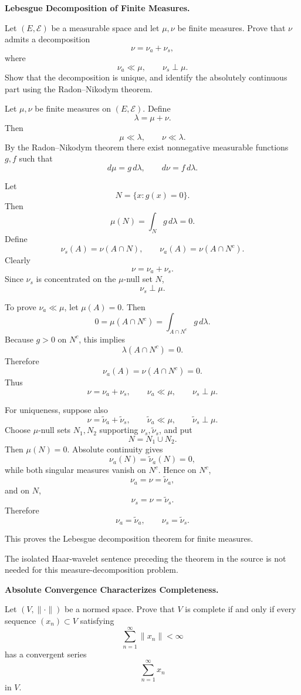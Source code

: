 \begin{problem}[CP-II-0498]
\label{prob:cp-ii-0498}
\textbf{Lebesgue Decomposition of Finite Measures.}

\hspace*{1.5em}Let \((E,\mathcal E)\) be a measurable space and let \(\mu,\nu\) be finite measures.
Prove that \(\nu\) admits a decomposition
\[
\nu=\nu_a+\nu_s,
\]
where
\[
\nu_a\ll\mu,
\qquad
\nu_s\perp\mu.
\]
Show that the decomposition is unique, and identify the absolutely continuous
part using the Radon--Nikodym theorem.
\end{problem}

\begin{solution}
Let \(\mu,\nu\) be finite measures on \((E,\mathcal E)\). Define
\[
\lambda=\mu+\nu.
\]
Then
\[
\mu\ll\lambda,
\qquad
\nu\ll\lambda.
\]
By the Radon--Nikodym theorem there exist nonnegative measurable functions \(g,f\) such that
\[
d\mu=g\,d\lambda,
\qquad
d\nu=f\,d\lambda.
\]

Let
\[
N=\{x:g(x)=0\}.
\]
Then
\[
\mu(N)
=
\int_N g\,d\lambda
=
0.
\]
Define
\[
\nu_s(A)=\nu(A\cap N),
\qquad
\nu_a(A)=\nu(A\cap N^c).
\]
Clearly
\[
\nu=\nu_a+\nu_s.
\]
Since \(\nu_s\) is concentrated on the \(\mu\)-null set \(N\),
\[
\nu_s\perp\mu.
\]

To prove \(\nu_a\ll\mu\), let \(\mu(A)=0\). Then
\[
0
=
\mu(A\cap N^c)
=
\int_{A\cap N^c}g\,d\lambda.
\]
Because \(g>0\) on \(N^c\), this implies
\[
\lambda(A\cap N^c)=0.
\]
Therefore
\[
\nu_a(A)
=
\nu(A\cap N^c)
=
0.
\]
Thus
\[
\boxed{
\nu=\nu_a+\nu_s,\qquad
\nu_a\ll\mu,\qquad
\nu_s\perp\mu.
}
\]

For uniqueness, suppose also
\[
\nu=\widetilde\nu_a+\widetilde\nu_s,
\qquad
\widetilde\nu_a\ll\mu,
\qquad
\widetilde\nu_s\perp\mu.
\]
Choose \(\mu\)-null sets \(N_1,N_2\) supporting \(\nu_s,\widetilde\nu_s\), and put
\[
N=N_1\cup N_2.
\]
Then \(\mu(N)=0\). Absolute continuity gives
\[
\nu_a(N)=\widetilde\nu_a(N)=0,
\]
while both singular measures vanish on \(N^c\). Hence on \(N^c\),
\[
\nu_a=\nu=\widetilde\nu_a,
\]
and on \(N\),
\[
\nu_s=\nu=\widetilde\nu_s.
\]
Therefore
\[
\boxed{
\nu_a=\widetilde\nu_a,\qquad
\nu_s=\widetilde\nu_s.
}
\]

This proves the Lebesgue decomposition theorem for finite measures.

The isolated Haar-wavelet sentence preceding the theorem in the source is not needed for
this measure-decomposition problem.
\end{solution}


\begin{problem}[CP-II-0500]
\label{prob:cp-ii-0500}
\textbf{Absolute Convergence Characterizes Completeness.}

\hspace*{1.5em}Let \((V,\|\cdot\|)\) be a normed space. Prove that \(V\) is complete if and
only if every sequence \((x_n)\subset V\) satisfying
\[
\sum_{n=1}^{\infty}\|x_n\|<\infty
\]
has a convergent series
\[
\sum_{n=1}^{\infty}x_n
\]
in \(V\).
\end{problem}

